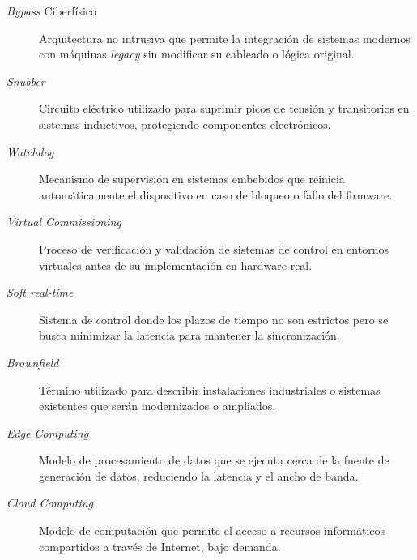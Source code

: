 \begin{description}
  \item[\textit{Bypass} Ciberfísico] Arquitectura no intrusiva que permite la integración de sistemas modernos con máquinas \textit{legacy} sin modificar su cableado o lógica original.
  
  \item[\textit{Snubber}] Circuito eléctrico utilizado para suprimir picos de tensión y transitorios en sistemas inductivos, protegiendo componentes electrónicos.
  
  \item[\textit{Watchdog}] Mecanismo de supervisión en sistemas embebidos que reinicia automáticamente el dispositivo en caso de bloqueo o fallo del firmware.
  
  \item[\textit{Virtual Commissioning}] Proceso de verificación y validación de sistemas de control en entornos virtuales antes de su implementación en hardware real.
  
  \item[\textit{Soft real-time}] Sistema de control donde los plazos de tiempo no son estrictos pero se busca minimizar la latencia para mantener la sincronización.
  
  \item[\textit{Brownfield}] Término utilizado para describir instalaciones industriales o sistemas existentes que serán modernizados o ampliados.
  
  \item[\textit{Edge Computing}] Modelo de procesamiento de datos que se ejecuta cerca de la fuente de generación de datos, reduciendo la latencia y el ancho de banda.
  
  \item[\textit{Cloud Computing}] Modelo de computación que permite el acceso a recursos informáticos compartidos a través de Internet, bajo demanda.
  
\end{description}

